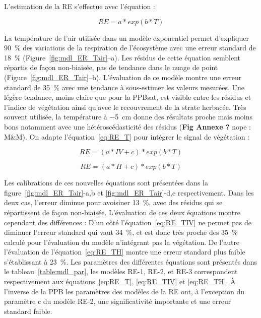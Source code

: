 

L'estimation de la RE s'effectue avec l'équation :

\begin{equation} \label{eq:RE_T}
RE = a*exp(b*T)
\end{equation}

La température de l'air utilisée dans un modèle exponentiel permet d'expliquer \SI{90}{\percent} des variations de la respiration de l'écosystème avec une erreur standard de \SI{18}{\percent} (Figure~\ref{fig:mdl_ER_Tair}--a).
Les résidus de cette équation semblent répartis de façon non-biaisée, pas de tendance dans le nuage de point (Figure~\ref{fig:mdl_ER_Tair}--b).
L'évaluation de ce modèle montre une erreur standard de \SI{35}{\percent} avec une tendance à sous-estimer les valeurs mesurées.
Une légère tendance, moins claire que pour la PPBsat, est visible entre les résidus et l'indice de végétation ainsi qu'avec le recouvrement de la strate herbacée.
Très souvent utilisée, la température à \SI{-5}{\centi\metre} donne des résultats proche mais moins bons notamment avec une hétéroscédasticité des résidus (\textbf{Fig Annexe ?} nope : M\&M).
On adapte l'équation~\ref{eq:RE_T} pour intégrer le signal de végétation :

\begin{equation} \label{eq:RE_TIV}
RE = (a*IV + c)*exp(b*T)
\end{equation}

\begin{equation} \label{eq:RE_TH}
RE = (a*H + c)*exp(b*T)
\end{equation}

Les calibrations de ces nouvelles équations sont présentées dans la figure~\ref{fig:mdl_ER_Tair}-a,b et \ref{fig:mdl_ER_Tair}-d,e respectivement.
Dans les deux cas, l'erreur diminue pour avoisiner \SI{13}{\percent}, avec des résidus qui se répartissent de façon non-biaisée.
L'évaluation de ces deux équations montre cependant des différences :
D'un côté l'équation~\ref{eq:RE_TIV} ne permet pas de diminuer l'erreur standard qui vaut \SI{34}{\percent}, et est donc très proche des \SI{35}{\percent} calculé pour l'évaluation du modèle n'intégrant pas la végétation.
De l'autre l'évaluation de l'équation~\ref{eq:RE_TH} montre une erreur standard plus faible s'établissant à \SI{23}{\percent}.
Les paramètres des différentes équations sont présentés dans le tableau~\ref{table:mdl_par}, les modèles RE-1, RE-2, et RE-3 correspondent respectivement aux équations~\ref{eq:RE_T}, \ref{eq:RE_TIV} et \ref{eq:RE_TH}.
À l'inverse de la PPB les paramètres des modèles de la RE ont, à l'exception du paramètre c du modèle RE-2, une significativité importante et une erreur standard faible.

